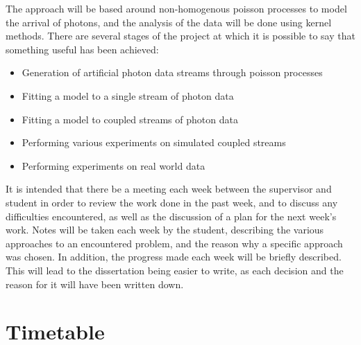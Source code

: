 \documentclass[10pt,a4paper]{article}
\begin{document}
The approach will be based around non-homogenous poisson processes to model the arrival of photons, and the analysis of the data will be done using kernel methods. There are several stages of the project at which it is possible to say that something useful has been achieved:
\begin{itemize}
  \item Generation of artificial photon data streams through poisson processes
  \item Fitting a model to a single stream of photon data
  \item Fitting a model to coupled streams of photon data
  \item Performing various experiments on simulated coupled streams
  \item Performing experiments on real world data
\end{itemize}
It is intended that there be a meeting each week between the supervisor and student in order to review the work done in the past week, and to discuss any difficulties encountered, as well as the discussion of a plan for the next week's work. Notes will be taken each week by the student, describing the various approaches to an encountered problem, and the reason why a specific approach was chosen. In addition, the progress made each week will be briefly described. This will lead to the dissertation being easier to write, as each decision and the reason for it will have been written down. 

\section*{Timetable}

\begin{gantt}{15}{9}
  \begin{ganttitle}
  \end{ganttitle}
  \begin{ganttitle}
  \end{ganttitle}
\end{gantt}
\end{document}
